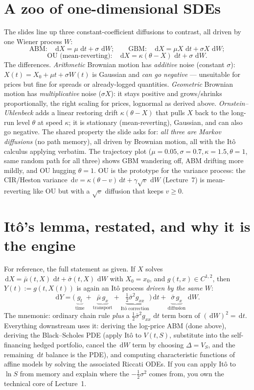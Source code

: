 \documentclass[11pt]{article}
\newcommand{\dd}{\,\mathrm{d}}
\begin{document}
\section{A zoo of one-dimensional SDEs}

The slides line up three constant-coefficient diffusions to contrast, all driven by one Wiener process $W$:
\[
\text{ABM:}\quad \dd X=\mu\,\dd t+\sigma\,\dd W;\qquad
\text{GBM:}\quad \dd X=\mu X\,\dd t+\sigma X\,\dd W;
\]
\[
\text{OU (mean-reverting):}\quad \dd X=\kappa(\theta-X)\,\dd t+\sigma\,\dd W.
\]
The differences. \emph{Arithmetic} Brownian motion has \emph{additive} noise (constant $\sigma$): $X(t)=X_0+\mu t+\sigma W(t)$ is Gaussian and \emph{can go negative} --- unsuitable for prices but fine for spreads or already-logged quantities. \emph{Geometric} Brownian motion has \emph{multiplicative} noise ($\sigma X$): it stays positive and grows/shrinks proportionally, the right scaling for prices, lognormal as derived above. \emph{Ornstein--Uhlenbeck} adds a linear restoring drift $\kappa(\theta-X)$ that pulls $X$ back to the long-run level $\theta$ at speed $\kappa$; it is stationary (mean-reverting), Gaussian, and can also go negative. The shared property the slide asks for: \emph{all three are Markov diffusions} (no path memory), all driven by Brownian motion, all with the It\^o calculus applying verbatim. The trajectory plot ($\mu=0.05,\sigma=0.7,\kappa=1.5,\theta=1$, same random path for all three) shows GBM wandering off, ABM drifting more mildly, and OU hugging $\theta=1$. OU is the prototype for the variance process: the CIR/Heston variance $\dd v=\kappa(\theta-v)\dd t+\gamma\sqrt v\,\dd W$ (Lecture~7) is mean-reverting like OU but with a $\sqrt v$ diffusion that keeps $v\ge0$.

\section{It\^o's lemma, restated, and why it is the engine}

For reference, the full statement as given. If $X$ solves $\dd X=\bar\mu(t,X)\,\dd t+\bar\sigma(t,X)\,\dd W$ with $X_0=x_0$, and $g(t,x)\in C^{1,2}$, then $Y(t):=g(t,X(t))$ is again an It\^o process \emph{driven by the same $W$}:
\[
\dd Y=\Big(\underbrace{g_t}_{\text{time}}+\underbrace{\bar\mu\,g_x}_{\text{transport}}+\underbrace{\tfrac12\bar\sigma^2 g_{xx}}_{\text{It\^o correction}}\Big)\dd t+\underbrace{\bar\sigma\,g_x}_{\text{diffusion}}\,\dd W.
\]
The mnemonic: ordinary chain rule \emph{plus} a $\tfrac12\bar\sigma^2 g_{xx}\,\dd t$ term born of $(\dd W)^2=\dd t$. Everything downstream uses it: deriving the log-price ABM (done above), deriving the Black--Scholes PDE (apply It\^o to $V(t,S)$, substitute into the self-financing hedged portfolio, cancel the $\dd W$ term by choosing $\Delta=V_S$, and the remaining $\dd t$ balance is the PDE), and computing characteristic functions of affine models by solving the associated Riccati ODEs. If you can apply It\^o to $\ln S$ from memory and explain where the $-\tfrac12\sigma^2$ comes from, you own the technical core of Lecture~1.
\end{document}
